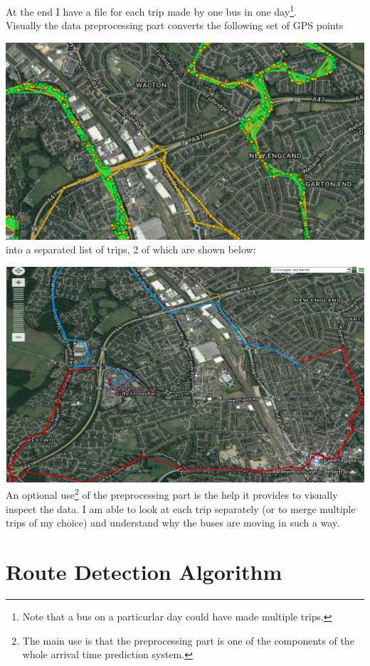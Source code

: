 \documentclass[12pt,a4paper,oneside,openright]{report}
\begin{document}
At the end I have a file for each trip made by one bus in one
day\footnote{Note that a bus on a particurlar day could have made
multiple trips.}. \\

Visually the data preprocessing part converts the following set of GPS points

\includegraphics[width=\textwidth]{figs/unprocessed.png} \\

into a separated list of trips, 2 of which are shown below:

\includegraphics[width=\textwidth]{figs/processed.png} \\

An optional use\footnote{The main use is that the preprocessing part is one of the
components of the whole arrival time prediction system.} of the preprocessing part
is the help it provides to visually inspect the data. I am able to look at each trip
separately (or to merge multiple trips of my choice) and understand why the buses are
moving in such a way.

\section{Route Detection Algorithm}
\end{document}
